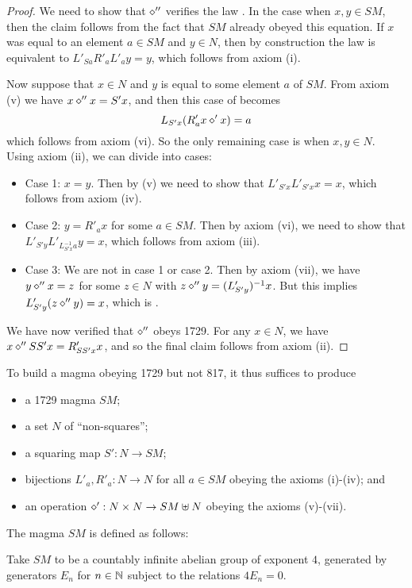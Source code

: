 \begin{proof}  We need to show that $\diamond''$ verifies the law .  In the case when $x,y \in SM$, then the claim follows from the fact that $SM$ already obeyed this equation.  If $x$ was equal to an element $a \in SM$ and $y \in N$, then by construction the law is equivalent to $L'_{Sa} R'_a L'_a y = y$, which follows from axiom (i).

Now suppose that $x \in N$ and $y$ is equal to some element $a$ of $SM$.  From axiom (v) we have $x \diamond'' x = S'x$, and then this case of  becomes
$$L_{S'x} ( R'_a x \diamond' x ) = a$$
which follows from axiom (vi).  So the only remaining case is when $x,y \in N$.  Using axiom (ii), we can divide into cases:
\begin{itemize}
\item Case 1: $x=y$.  Then by (v) we need to show that $L'_{S'x} L'_{S'x} x = x$, which follows from axiom (iv).
\item Case 2: $y = R'_a x$ for some $a \in SM$.  Then by axiom (vi), we need to show that $L'_{S'y} L'_{L_{S'x}^{-1} a} y = x$, which follows from axiom (iii).
\item Case 3: We are not in case 1 or case 2.  Then by axiom (vii), we have $y \diamond'' x = z$ for some $z \in N$ with $z \diamond'' y = (L'_{S'y})^{-1} x$.  But this implies $L'_{S'y} (z \diamond'' y) = x$, which is .
\end{itemize}

We have now verified that $\diamond''$ obeys 1729.  For any $x \in N$, we have $x \diamond'' SS' x = R'_{SS' x} x$, and so the final claim follows from axiom (ii).
\end{proof}

To build a magma obeying 1729 but not 817, it thus suffices to produce
\begin{itemize}
  \item a 1729 magma $SM$;
  \item a set $N$ of ``non-squares'';
  \item a squaring map $S': N \to SM$;
  \item bijections $L'_a, R'_a: N \to N$ for all $a \in SM$ obeying the axioms (i)-(iv); and
  \item an operation $\diamond': N \times N \to SM \uplus N$ obeying the axioms (v)-(vii).
\end{itemize}

The magma $SM$ is defined as follows:

\begin{definition}[Definition of $SM$]\label{sm-def} Take $SM$ to be a countably infinite abelian group of exponent $4$, generated by generators $E_n$ for $n \in \mathbb{N}$ subject to the relations $4E_n=0$.
\end{definition}

